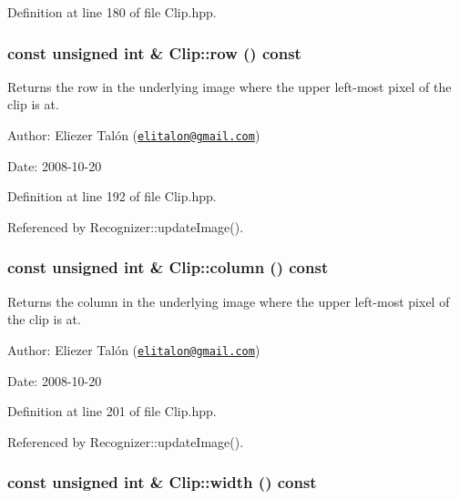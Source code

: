 Definition at line 180 of file Clip.hpp.\hypertarget{class_clip_1a1d1fd626d1325f0f2b9184de4c89b8}{
\subsubsection[row]{\setlength{\rightskip}{0pt plus 5cm}const unsigned int \& Clip::row () const}}
\label{class_clip_1a1d1fd626d1325f0f2b9184de4c89b8}


Returns the row in the underlying image where the upper left-most pixel of the clip is at. 

\begin{Desc}
\item[Author:]Eliezer Talón (\href{mailto:elitalon@gmail.com}{\tt elitalon@gmail.com}) \end{Desc}
\begin{Desc}
\item[Date:]2008-10-20 \end{Desc}


Definition at line 192 of file Clip.hpp.

Referenced by Recognizer::updateImage().\hypertarget{class_clip_06a34378fa0f23425d10bb04e9972a26}{
\subsubsection[column]{\setlength{\rightskip}{0pt plus 5cm}const unsigned int \& Clip::column () const}}
\label{class_clip_06a34378fa0f23425d10bb04e9972a26}


Returns the column in the underlying image where the upper left-most pixel of the clip is at. 

\begin{Desc}
\item[Author:]Eliezer Talón (\href{mailto:elitalon@gmail.com}{\tt elitalon@gmail.com}) \end{Desc}
\begin{Desc}
\item[Date:]2008-10-20 \end{Desc}


Definition at line 201 of file Clip.hpp.

Referenced by Recognizer::updateImage().\hypertarget{class_clip_88d1a47c0ec077e8c6680785509389b0}{
\subsubsection[width]{\setlength{\rightskip}{0pt plus 5cm}const unsigned int \& Clip::width () const}}
\label{class_clip_88d1a47c0ec077e8c6680785509389b0}


